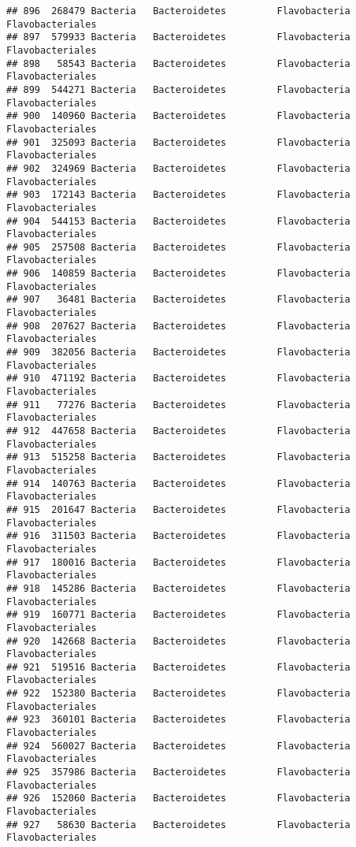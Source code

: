 \documentclass[
]{article}
\begin{document}
\begin{verbatim}
## 896  268479 Bacteria   Bacteroidetes         Flavobacteria    Flavobacteriales
## 897  579933 Bacteria   Bacteroidetes         Flavobacteria    Flavobacteriales
## 898   58543 Bacteria   Bacteroidetes         Flavobacteria    Flavobacteriales
## 899  544271 Bacteria   Bacteroidetes         Flavobacteria    Flavobacteriales
## 900  140960 Bacteria   Bacteroidetes         Flavobacteria    Flavobacteriales
## 901  325093 Bacteria   Bacteroidetes         Flavobacteria    Flavobacteriales
## 902  324969 Bacteria   Bacteroidetes         Flavobacteria    Flavobacteriales
## 903  172143 Bacteria   Bacteroidetes         Flavobacteria    Flavobacteriales
## 904  544153 Bacteria   Bacteroidetes         Flavobacteria    Flavobacteriales
## 905  257508 Bacteria   Bacteroidetes         Flavobacteria    Flavobacteriales
## 906  140859 Bacteria   Bacteroidetes         Flavobacteria    Flavobacteriales
## 907   36481 Bacteria   Bacteroidetes         Flavobacteria    Flavobacteriales
## 908  207627 Bacteria   Bacteroidetes         Flavobacteria    Flavobacteriales
## 909  382056 Bacteria   Bacteroidetes         Flavobacteria    Flavobacteriales
## 910  471192 Bacteria   Bacteroidetes         Flavobacteria    Flavobacteriales
## 911   77276 Bacteria   Bacteroidetes         Flavobacteria    Flavobacteriales
## 912  447658 Bacteria   Bacteroidetes         Flavobacteria    Flavobacteriales
## 913  515258 Bacteria   Bacteroidetes         Flavobacteria    Flavobacteriales
## 914  140763 Bacteria   Bacteroidetes         Flavobacteria    Flavobacteriales
## 915  201647 Bacteria   Bacteroidetes         Flavobacteria    Flavobacteriales
## 916  311503 Bacteria   Bacteroidetes         Flavobacteria    Flavobacteriales
## 917  180016 Bacteria   Bacteroidetes         Flavobacteria    Flavobacteriales
## 918  145286 Bacteria   Bacteroidetes         Flavobacteria    Flavobacteriales
## 919  160771 Bacteria   Bacteroidetes         Flavobacteria    Flavobacteriales
## 920  142668 Bacteria   Bacteroidetes         Flavobacteria    Flavobacteriales
## 921  519516 Bacteria   Bacteroidetes         Flavobacteria    Flavobacteriales
## 922  152380 Bacteria   Bacteroidetes         Flavobacteria    Flavobacteriales
## 923  360101 Bacteria   Bacteroidetes         Flavobacteria    Flavobacteriales
## 924  560027 Bacteria   Bacteroidetes         Flavobacteria    Flavobacteriales
## 925  357986 Bacteria   Bacteroidetes         Flavobacteria    Flavobacteriales
## 926  152060 Bacteria   Bacteroidetes         Flavobacteria    Flavobacteriales
## 927   58630 Bacteria   Bacteroidetes         Flavobacteria    Flavobacteriales

\end{verbatim}
\end{document}
